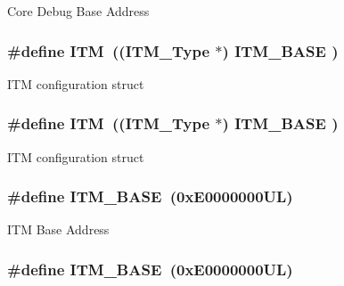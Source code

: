 Core Debug Base Address \hypertarget{group___c_m_s_i_s__core__register_gabae7cdf882def602cb787bb039ff6a43}{
\subsubsection[{I\-T\-M}]{\setlength{\rightskip}{0pt plus 5cm}\#define I\-T\-M~(({\bf I\-T\-M\-\_\-\-Type}       $\ast$)     {\bf I\-T\-M\-\_\-\-B\-A\-S\-E}      )}}\label{group___c_m_s_i_s__core__register_gabae7cdf882def602cb787bb039ff6a43}
I\-T\-M configuration struct \hypertarget{group___c_m_s_i_s__core__register_gabae7cdf882def602cb787bb039ff6a43}{
\subsubsection[{I\-T\-M}]{\setlength{\rightskip}{0pt plus 5cm}\#define I\-T\-M~(({\bf I\-T\-M\-\_\-\-Type}       $\ast$)     {\bf I\-T\-M\-\_\-\-B\-A\-S\-E}      )}}\label{group___c_m_s_i_s__core__register_gabae7cdf882def602cb787bb039ff6a43}
I\-T\-M configuration struct \hypertarget{group___c_m_s_i_s__core__register_gadd76251e412a195ec0a8f47227a8359e}{
\subsubsection[{I\-T\-M\-\_\-\-B\-A\-S\-E}]{\setlength{\rightskip}{0pt plus 5cm}\#define I\-T\-M\-\_\-\-B\-A\-S\-E~(0x\-E0000000\-U\-L)}}\label{group___c_m_s_i_s__core__register_gadd76251e412a195ec0a8f47227a8359e}
I\-T\-M Base Address \hypertarget{group___c_m_s_i_s__core__register_gadd76251e412a195ec0a8f47227a8359e}{
\subsubsection[{I\-T\-M\-\_\-\-B\-A\-S\-E}]{\setlength{\rightskip}{0pt plus 5cm}\#define I\-T\-M\-\_\-\-B\-A\-S\-E~(0x\-E0000000\-U\-L)}}\label{group___c_m_s_i_s__core__register_gadd76251e412a195ec0a8f47227a8359e}
